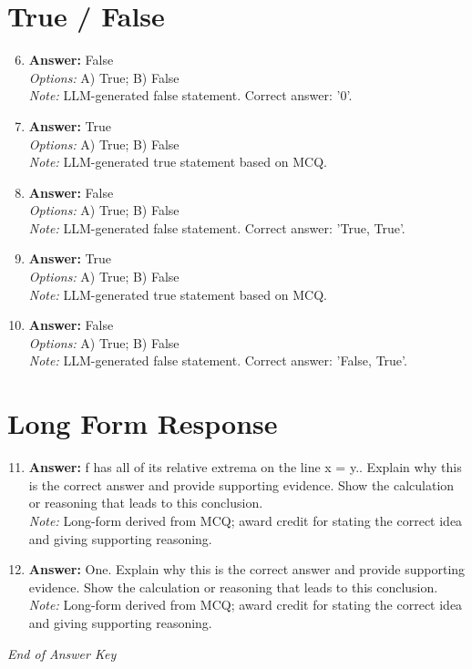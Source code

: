 \documentclass[12pt]{article}
\begin{document}
\section*{True / False}
\begin{enumerate}[label=\arabic*.]
\setcounter{enumi}{5}
\item \textbf{Answer:} False
\\ \textit{Options:} A) True; B) False
\\ \textit{Note:} LLM-generated false statement. Correct answer: '0'.
\item \textbf{Answer:} True
\\ \textit{Options:} A) True; B) False
\\ \textit{Note:} LLM-generated true statement based on MCQ.
\item \textbf{Answer:} False
\\ \textit{Options:} A) True; B) False
\\ \textit{Note:} LLM-generated false statement. Correct answer: 'True, True'.
\item \textbf{Answer:} True
\\ \textit{Options:} A) True; B) False
\\ \textit{Note:} LLM-generated true statement based on MCQ.
\item \textbf{Answer:} False
\\ \textit{Options:} A) True; B) False
\\ \textit{Note:} LLM-generated false statement. Correct answer: 'False, True'.
\end{enumerate}

\section*{Long Form Response}
\begin{enumerate}[label=\arabic*.]
\setcounter{enumi}{10}
\item \textbf{Answer:} f has all of its relative extrema on the line x = y.. Explain why this is the correct answer and provide supporting evidence. Show the calculation or reasoning that leads to this conclusion.
\\ \textit{Note:} Long-form derived from MCQ; award credit for stating the correct idea and giving supporting reasoning.
\item \textbf{Answer:} One. Explain why this is the correct answer and provide supporting evidence. Show the calculation or reasoning that leads to this conclusion.
\\ \textit{Note:} Long-form derived from MCQ; award credit for stating the correct idea and giving supporting reasoning.
\end{enumerate}

\vfill
\noindent\textit{End of Answer Key}
\end{document}
